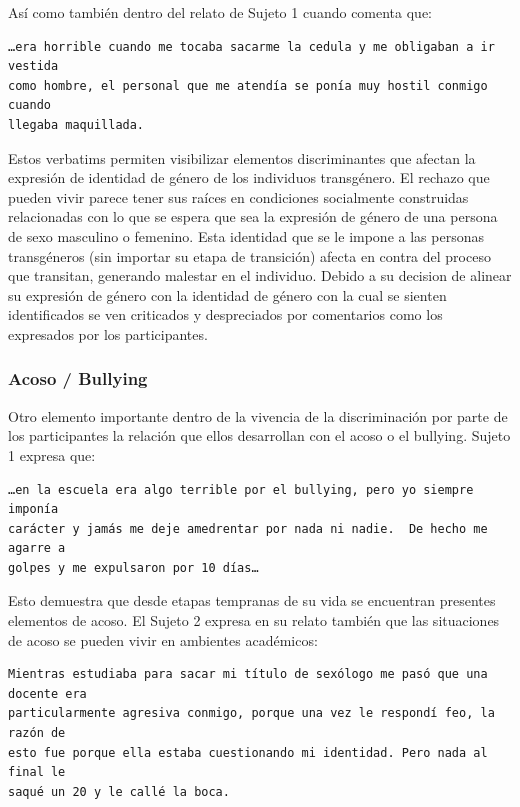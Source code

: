 Así como también dentro del relato de Sujeto 1 cuando comenta que:

\begin{verbatim}
…era horrible cuando me tocaba sacarme la cedula y me obligaban a ir vestida
como hombre, el personal que me atendía se ponía muy hostil conmigo cuando
llegaba maquillada.
\end{verbatim}

Estos verbatims permiten visibilizar elementos discriminantes que afectan la
expresión de identidad de género de los individuos transgénero. El rechazo que
pueden vivir parece tener sus raíces en condiciones socialmente construidas
relacionadas con lo que se espera que sea la expresión de género de una persona
de sexo masculino o femenino. Esta identidad que se le impone a las personas
transgéneros (sin importar su etapa de transición) afecta en contra del proceso
que transitan, generando malestar en el individuo. Debido a su decision de
alinear su expresión de género con la identidad de género con la cual se sienten
identificados se ven criticados y despreciados por comentarios como los
expresados por los participantes.

\subsubsection{Acoso / Bullying}

Otro elemento importante dentro de la vivencia de la discriminación por parte de
los participantes la relación que ellos desarrollan con el acoso o el bullying.
Sujeto 1 expresa que:

\begin{verbatim}
…en la escuela era algo terrible por el bullying, pero yo siempre imponía
carácter y jamás me deje amedrentar por nada ni nadie.  De hecho me agarre a
golpes y me expulsaron por 10 días…
\end{verbatim}

Esto demuestra que desde etapas tempranas de su vida se encuentran presentes
elementos de acoso. El Sujeto 2 expresa en su relato también que las situaciones
de acoso se pueden vivir en ambientes académicos:

\begin{verbatim}
Mientras estudiaba para sacar mi título de sexólogo me pasó que una docente era
particularmente agresiva conmigo, porque una vez le respondí feo, la razón de
esto fue porque ella estaba cuestionando mi identidad. Pero nada al final le
saqué un 20 y le callé la boca.
\end{verbatim}

